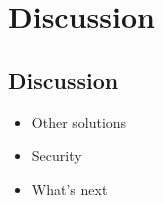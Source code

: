 \part{Discussion} \label{part:discussion}
\chapter{Discussion} 

\begin{itemize}
	\item Other solutions
	\item Security
	\item What's next
\end{itemize}
